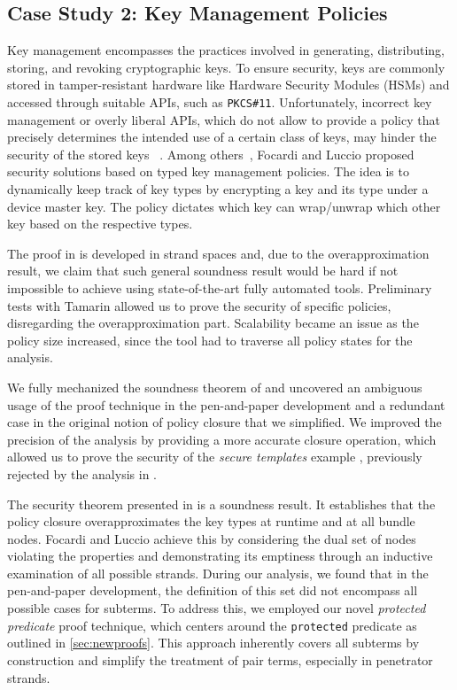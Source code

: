 \subsection{Case Study 2: Key Management Policies}\label{subsec:KMP}
Key management encompasses the practices involved in generating, distributing, storing, and revoking cryptographic keys. To ensure security, keys are commonly stored in tamper-resistant hardware like Hardware Security Modules (HSMs) and accessed through suitable APIs, such as \texttt{PKCS\#11}.
Unfortunately, incorrect key management or overly liberal APIs, which do not allow to provide a policy that precisely determines the intended use of a certain class of keys, may hinder the security of the stored keys ~\cite{anderson00correctness,clulow03pkcs11}.
Among others~\cite{CentenaroFL13,KunPOST15}, Focardi and Luccio \cite{focardi2021secure} proposed security solutions based on {typed key management policies}.
The idea is to dynamically keep track of key types by encrypting a key and its type under a device master key. The policy dictates which key can wrap/unwrap which other key based on the respective types.

The proof in \cite{focardi2021secure} is developed in strand spaces and, due to the overapproximation result, we claim that such general soundness result would be hard if not impossible to achieve using state-of-the-art fully automated tools.
Preliminary tests with Tamarin allowed us to prove the security of specific policies, disregarding the overapproximation part.
Scalability became an issue as the policy size increased,  since the tool had to traverse all policy states for the analysis.

 We fully mechanized the soundness theorem of \cite{focardi2021secure} and uncovered an ambiguous usage of the proof technique in the pen-and-paper development and a redundant case in the original notion of policy closure that we simplified. We improved the precision of the analysis by providing a more accurate closure operation, which allowed us to prove the security of the \emph{secure templates} example \cite{BCFS-ccs10}, previously rejected by the analysis in \cite{focardi2021secure}.

 The security theorem presented in \cite{focardi2021secure}
is a soundness result.
It establishes that the policy closure overapproximates the key types at runtime and at all bundle nodes.
Focardi and Luccio achieve this by considering the dual set of nodes violating the properties and demonstrating its emptiness through an inductive examination of all possible strands. During our analysis, we found that in the pen-and-paper development, the definition of this set did not encompass all possible cases for subterms. To address this, we employed our novel \emph{protected predicate} proof technique, which centers around the \lstinline|protected| predicate as outlined in \cref{sec:newproofs}. This approach inherently covers all subterms by construction and simplify the treatment of pair terms, especially in penetrator strands.

